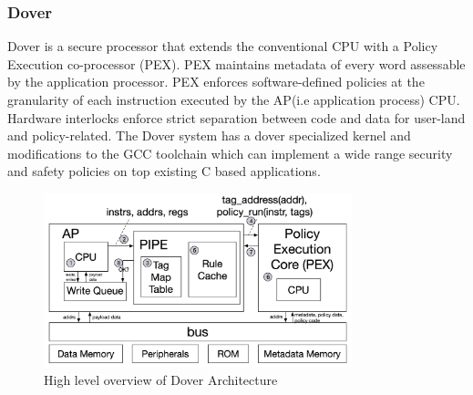 \subsubsection{Dover}
Dover\cite{Dover} is a secure processor that extends the conventional CPU with
a Policy Execution co-processor (PEX). PEX maintains metadata 
of every word assessable by the application processor. PEX 
enforces software-defined policies
at the granularity of each instruction executed by the AP(i.e application process)
CPU. Hardware interlocks enforce strict separation between code and data 
for user-land and policy-related. The Dover system has 
a dover specialized kernel and modifications to the GCC toolchain 
which can implement a wide range security and safety policies on 
top existing C based applications. 

\begin{figure}[htbp!] 
  \centering    
  \includegraphics[width=0.8\textwidth]{Dover}
  \caption[Dover]{High level overview of Dover Architecture \cite{Dover}}
  \label{fig:Dover}
  \end{figure}





